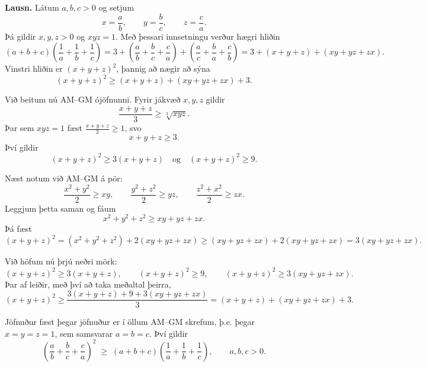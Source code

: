 
\textbf{Lausn.}
Látum $a,b,c>0$ og setjum
\[
x=\frac{a}{b}, \qquad y=\frac{b}{c}, \qquad z=\frac{c}{a}.
\]
Þá gildir $x,y,z>0$ og $xyz=1$. Með þessari innsetningu verður hægri hliðin
\[
(a+b+c)\!\left(\frac{1}{a}+\frac{1}{b}+\frac{1}{c}\right)
= 3 + \left(\frac{a}{b}+\frac{b}{c}+\frac{c}{a}\right)
  + \left(\frac{a}{c}+\frac{b}{a}+\frac{c}{b}\right)
= 3 + (x+y+z) + (xy+yz+zx).
\]
Vinstri hliðin er $(x+y+z)^2$, þannig að nægir að sýna
\[
(x+y+z)^2 \ge (x+y+z) + (xy+yz+zx) + 3.
\]

Við beitum nú AM–GM ójöfnunni. Fyrir jákvæð $x,y,z$ gildir
\[
\frac{x+y+z}{3} \ge \sqrt[3]{xyz}.
\]
Þar sem $xyz=1$ fæst $\frac{x+y+z}{3} \ge 1$, svo
\[
x+y+z \ge 3.
\]
Því gildir
\[
(x+y+z)^2 \ge 3(x+y+z)
\quad\text{og}\quad
(x+y+z)^2 \ge 9.
\]

Næst notum við AM–GM á pör:
\[
\frac{x^2+y^2}{2} \ge xy, \qquad
\frac{y^2+z^2}{2} \ge yz, \qquad
\frac{z^2+x^2}{2} \ge zx.
\]
Leggjum þetta saman og fáum
\[
x^2 + y^2 + z^2 \ge xy + yz + zx.
\]
Þá fæst
\[
(x+y+z)^2
= (x^2+y^2+z^2) + 2(xy+yz+zx)
\ge (xy+yz+zx) + 2(xy+yz+zx)
= 3(xy+yz+zx).
\]

Við höfum nú þrjú neðri mörk:
\[
(x+y+z)^2 \ge 3(x+y+z), \qquad
(x+y+z)^2 \ge 9, \qquad
(x+y+z)^2 \ge 3(xy+yz+zx).
\]
Þar af leiðir, með því að taka meðaltal þeirra,
\[
(x+y+z)^2
\ge \frac{3(x+y+z) + 9 + 3(xy+yz+zx)}{3}
= (x+y+z) + (xy+yz+zx) + 3.
\]

Jöfnuður fæst þegar jöfnuður er í öllum AM–GM skrefum, þ.e. þegar $x=y=z=1$, sem samsvarar $a=b=c$.
Því gildir
\[
\left(\frac{a}{b}+\frac{b}{c}+\frac{c}{a}\right)^{\!2}
\;\ge\;
(a+b+c)\!\left(\frac{1}{a}+\frac{1}{b}+\frac{1}{c}\right),
\qquad a,b,c>0.
\]
